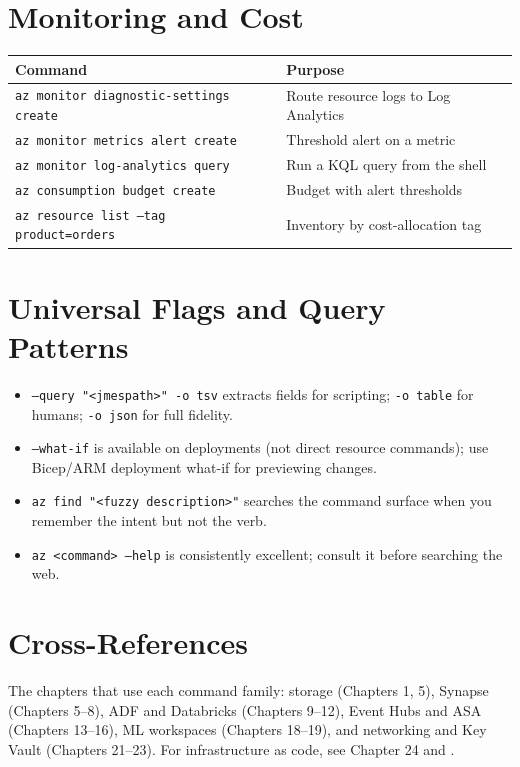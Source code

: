 \section{Monitoring and Cost}

\begin{center}
\footnotesize
\begin{tabular}{@{}p{7.4cm}p{6.0cm}@{}}
\toprule
\textbf{Command} & \textbf{Purpose} \\
\midrule
\texttt{az monitor diagnostic-settings create} & Route resource logs to Log Analytics \\
\texttt{az monitor metrics alert create} & Threshold alert on a metric \\
\texttt{az monitor log-analytics query} & Run a KQL query from the shell \\
\texttt{az consumption budget create} & Budget with alert thresholds \\
\texttt{az resource list --tag product=orders} & Inventory by cost-allocation tag \\
\bottomrule
\end{tabular}
\end{center}

\section{Universal Flags and Query Patterns}
\begin{itemize}
    \item \texttt{--query "<jmespath>" -o tsv} extracts fields for scripting;
          \texttt{-o table} for humans; \texttt{-o json} for full fidelity.
    \item \texttt{--what-if} is available on deployments (not direct resource
          commands); use Bicep/ARM deployment what-if for previewing changes.
    \item \texttt{az find "<fuzzy description>"} searches the command surface
          when you remember the intent but not the verb.
    \item \texttt{az <command> --help} is consistently excellent; consult it
          before searching the web.
\end{itemize}

\section{Cross-References}
The chapters that use each command family: storage (Chapters 1, 5), Synapse
(Chapters 5--8), ADF and Databricks (Chapters 9--12), Event Hubs and ASA
(Chapters 13--16), ML workspaces (Chapters 18--19), and networking and Key Vault
(Chapters 21--23). For infrastructure as code, see Chapter 24 and
\cite{hashicorp2025azurerm,microsoft2025bicep}.

